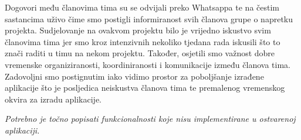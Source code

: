 		Dogovori među članovima tima su se odvijali preko Whatsappa te na čestim sastancima uživo čime smo postigli informiranost svih članova grupe o napretku projekta. Sudjelovanje na ovakvom projektu bilo je vrijedno iskustvo svim članovima tima jer smo kroz intenzivnih nekoliko tjedana rada iskusili što to znači raditi u timu na nekom projektu. Također, osjetili smo važnost dobre vremenske organiziranosti, koordiniranosti i komunikacije između članova tima. Zadovoljni smo postignutim iako vidimo prostor za poboljšanje izrađene aplikacije što je posljedica neiskustva članova tima te premalenog vremenskog okvira za izradu aplikacije.
		
		 \textit{Potrebno je točno popisati funkcionalnosti koje nisu implementirane u ostvarenoj aplikaciji.}
		
		\eject 